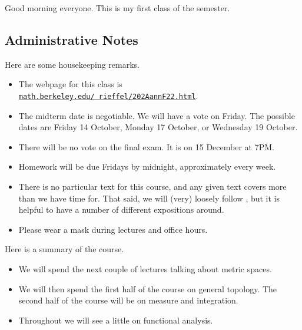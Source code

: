 \documentclass[../notes.tex]{subfiles}
\begin{document}
Good morning everyone. This is my first class of the semester.

\subsection{Administrative Notes}
Here are some housekeeping remarks.
\begin{itemize}
	\item The webpage for this class is \texttt{\href{https://math.berkeley.edu/~rieffel/202AannF22.html}{math.berkeley.edu/~rieffel/202AannF22.html}}.
	\item The midterm date is negotiable. We will have a vote on Friday. The possible dates are Friday 14 October, Monday 17 October, or Wednesday 19 October.
	\item There will be no vote on the final exam. It is on 15 December at 7PM.
	\item Homework will be due Fridays by midnight, approximately every week.
	\item There is no particular text for this course, and any given text covers more than we have time for. That said, we will (very) loosely follow \cite{lang-analysis}, but it is helpful to have a number of different expositions around.
	\item Please wear a mask during lectures and office hours.
\end{itemize}
Here is a summary of the course.
\begin{itemize}
	\item We will spend the next couple of lectures talking about metric spaces.
	\item We will then spend the first half of the course on general topology. The second half of the course will be on measure and integration.
	\item Throughout we will see a little on functional analysis.
\end{itemize}
\end{document}
